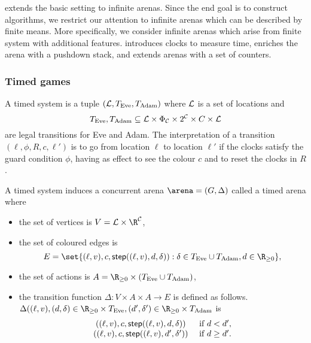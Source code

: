 

 extends the basic setting to infinite arenas.
Since the end goal is to construct algorithms, we restrict our attention to infinite arenas
which can be described by finite means.
More specifically, we consider infinite arenas which arise from finite system with additional features.
 introduces clocks to measure time,  enriches the arena with a pushdown stack,
and  extends arenas with a set of counters.

\subsubsection*{Timed games}

\begin{definition}
A timed system is a tuple $(\mathcal{L},T_{\text{Eve}},T_{\text{Adam}})$ where 
$\mathcal{L}$ is a set of locations
and 
\[
T_{\text{Eve}},T_{\text{Adam}} \subseteq \mathcal{L} \times \Phi_{\mathcal{C}} \times 2^{\mathcal{C}} \times C \times \mathcal{L}
\]
are legal transitions for Eve and Adam.
The interpretation of a transition $(\ell,\phi,R,c,\ell')$ is to go from location $\ell$
to location $\ell'$ if the clocks satisfy the guard condition $\phi$,
having as effect to see the colour $c$ and to reset the clocks in $R$.

A timed system induces a concurrent arena $\arena = (G,\Delta)$ called a timed arena where 
\begin{itemize}
	\item the set of vertices is $V = \Locations \times \R^{\Clocks}$,
	\item the set of coloured edges is 
	\[
	E = \set{(\ell,v),c, \step((\ell,v), d, \delta)) : \delta \in T_{\text{Eve}} \cup T_{\text{Adam}}, d \in \Rp},
	\]
	\item the set of actions is $A = \Rp \times (T_{\text{Eve}} \cup T_{\text{Adam}})$,
	\item the transition function $\Delta : V \times A \times A \to E$ is defined as follows.
	$\Delta((\ell,v), (d,\delta) \in \Rp \times T_{\text{Eve}}, (d',\delta') \in \Rp \times T_{\text{Adam}}$ is
	\[
	\begin{array}{cc}
	\left((\ell,v),c, \mathsf{step}((\ell,v), d, \delta) \right)	& \text{ if } d < d', \\
	\left((\ell,v),c, \mathsf{step}((\ell,v), d', \delta') \right)	& \text{ if } d \ge d'. \\
	\end{array}
	\]
\end{itemize}
\end{definition}

